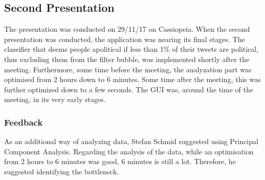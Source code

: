 \subsection{Second Presentation}\label{subsec:Exp2}
The presentation was conducted on 29/11/17 on Cassiopeia. When the second
presentation was conducted, the application was nearing its final stages. The
classifier that deems people apolitical if less than 1\% of their tweets are
political, thus excluding them from the filter bubble, was implemented shortly
after the meeting. Furthermore, some time before the meeting, the analyzation
part was optimised from 2 hours down to 6 minutes. Some time after the meeting,
this was further optimized down to a few seconds. The GUI was, around the time
of the meeting, in its very early stages.

\subsubsection{Feedback}
As an additional way of analyzing data, Stefan Schmid suggested using Principal
Component Analysis. Regarding the analysis of the data, while an optimisation
from 2 hours to 6 minutes was good, 6 minutes is still a lot. Therefore, he
suggested identifying the bottleneck. 

